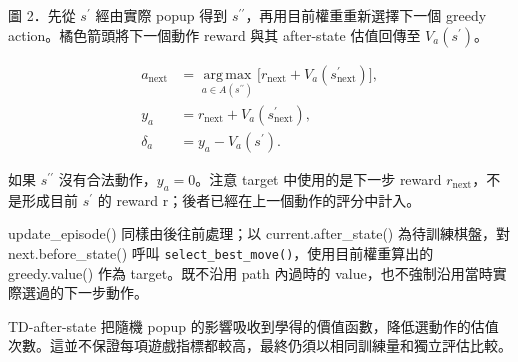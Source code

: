 \documentclass[10pt,a4paper]{article}
\newcommand{\topic}[1]{\par\vspace{5pt}{\sffamily\bfseries\large\color{blue}#1}\par\vspace{2pt}}
\begin{document}
\begin{center}\end{center}

{\small 圖 2．先從 \(s^{\prime}\) 經由實際 popup 得到 \(s^{\prime\prime}\)，再用目前權重重新選擇下一個 greedy action。橘色箭頭將下一個動作 reward 與其 after-state 估值回傳至 \(V_a(s^{\prime})\)。\par}

\begin{align*}
a_{\mathrm{next}}&=\operatorname*{arg\,max}_{a\in A(s^{\prime\prime})}
\bigl[r_{\mathrm{next}}+V_a(s^{\prime}_{\mathrm{next}})\bigr],\\
y_a&=r_{\mathrm{next}}+V_a(s^{\prime}_{\mathrm{next}}),\\
\delta_a&=y_a-V_a(s^{\prime}).
\end{align*}

如果 \(s^{\prime\prime}\) 沒有合法動作，\(y_a=0\)。注意 target 中使用的是下一步 reward \(r_{\mathrm{next}}\)，不是形成目前 \(s^{\prime}\) 的 reward r；後者已經在上一個動作的評分中計入。\par

\topic{11. 更新流程與兩版差異}

update\_episode() 同樣由後往前處理；以 current.after\_state() 為待訓練棋盤，對 next.before\_state() 呼叫 \texttt{select\_\allowbreak best\_\allowbreak move()}，使用目前權重算出的 greedy.value() 作為 target。既不沿用 path 內過時的 value，也不強制沿用當時實際選過的下一步動作。\par

{\small TD-after-state 把隨機 popup 的影響吸收到學得的價值函數，降低選動作的估值次數。這並不保證每項遊戲指標都較高，最終仍須以相同訓練量和獨立評估比較。\par}
\end{document}
